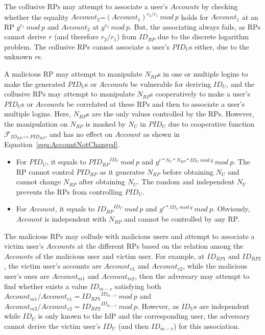 The collusive RPs may attempt to associate  a user's $Account$s by checking whether the equality $Account_2$=$(Account_1)^{r_2/r_1}\ mod\ p$ holds for $Account_1$ at an RP $g^{r_1}\ mod\ p$ and $Account_2$ at $g^{r_2}\ mod\ p$.
But, the associating always fails, as RPs cannot derive $r$ (and therefore ${r_2/r_1}$) from $ID_{RP}$ due to the discrete logarithm problem.
The collusive RPs cannot associate a user's  $PID_U$s either, due to the unknown $r$s.


A malicious RP may attempt to manipulate $N_{RP}$s in one or multiple logins to make the generated $PID_U$s or $Account$s be vulnerable for deriving $ID_U$,
 and the collusive RPs may attempt to manipulate $N_{RP}$s cooperatively to make a user's $PID_U$s or $Account$s be correlated at these RPs and then to associate a user's multiple logins.
Here, $N_{RP}$s are the only values controlled by the RPs.
However, the manipulation on $N_{RP}$ is masked by $N_U$ in $PID_U$ due to cooperative function $\mathcal{F}_{ID_{RP} \mapsto PID_{RP}}$,
 and has no effect on $Account$ as shown in Equation~\ref{equ:AccountNotChanged}.
\begin{itemize}
  \item For $PID_U$, it equals to ${PID_{RP}}^{ID_U}\ mod\ p$ and $g^{r*N_U*N_{RP}*ID_U\ mod\ q}\ mod\ p$. The RP cannot control $PID_{RP}$ as it generates $N_{RP}$ before obtaining $N_U$ and cannot change $N_{RP}$ after obtaining $N_U$. The random and independent $N_U$ prevents the RPs from controlling $PID_U$.
  \item For $Account$, it equals to ${ID_{RP}}^{ID_U}\ mod\ p$ and $g^{r*ID_U\ mod\ q}\ mod\ p$. Obviously, $Account$ is independent with $N_{RP}$ and cannot be controlled by any RP.
\end{itemize}

The malicious RPs may collude with  malicious users and attempt to associate a victim user's $Account$s  at the different RPs based on the relation among the $Account$s of the malicious user and victim user.
For example, at $ID_{RP1}$ and $ID_{RP2}$, the victim user's accounts are $Account_{v1}$ and $Account_{v2}$, while the malicious user's ones are $Account_{m1}$ and $Account_{m2}$, then the adversary may attempt to find whether exists a value $ID_{m-v}$ satisfying both $Account_{m1}/Account_{v1}={ID_{RP1}}^{ID_{m-v}}\ mod\ p$ and $Account_{m2}/Account_{v2}={ID_{RP2}}^{ID_{m-v}}\ mod\ p$.
However, as $ID_U$s are independent while $ID_U$ is only known to the IdP and the corresponding user,
the adversary cannot derive the victim user's $ID_U$ (and then $ID_{m-v}$) for this association.

